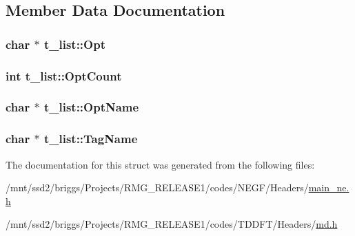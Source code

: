 \subsection{Member Data Documentation}
\hypertarget{structt__list_ac140958cb07ab7fb2e88eb138aca658d}{
\subsubsection[{Opt}]{\setlength{\rightskip}{0pt plus 5cm}char $\ast$ t\-\_\-list\-::\-Opt}}\label{structt__list_ac140958cb07ab7fb2e88eb138aca658d}
\hypertarget{structt__list_a999b775cc4f01f694ce601de094bfc1e}{
\subsubsection[{Opt\-Count}]{\setlength{\rightskip}{0pt plus 5cm}int t\-\_\-list\-::\-Opt\-Count}}\label{structt__list_a999b775cc4f01f694ce601de094bfc1e}
\hypertarget{structt__list_abe6fe63801e989339f4c94fd010eba39}{
\subsubsection[{Opt\-Name}]{\setlength{\rightskip}{0pt plus 5cm}char $\ast$ t\-\_\-list\-::\-Opt\-Name}}\label{structt__list_abe6fe63801e989339f4c94fd010eba39}
\hypertarget{structt__list_aeb59520bc7bc6da831bfe92d683bf92e}{
\subsubsection[{Tag\-Name}]{\setlength{\rightskip}{0pt plus 5cm}char $\ast$ t\-\_\-list\-::\-Tag\-Name}}\label{structt__list_aeb59520bc7bc6da831bfe92d683bf92e}


The documentation for this struct was generated from the following files\-:\begin{DoxyCompactItemize}
\item 
/mnt/ssd2/briggs/\-Projects/\-R\-M\-G\-\_\-\-R\-E\-L\-E\-A\-S\-E1/codes/\-N\-E\-G\-F/\-Headers/\hyperlink{main__ne_8h}{main\-\_\-ne.\-h}\item 
/mnt/ssd2/briggs/\-Projects/\-R\-M\-G\-\_\-\-R\-E\-L\-E\-A\-S\-E1/codes/\-T\-D\-D\-F\-T/\-Headers/\hyperlink{md_8h}{md.\-h}\end{DoxyCompactItemize}
